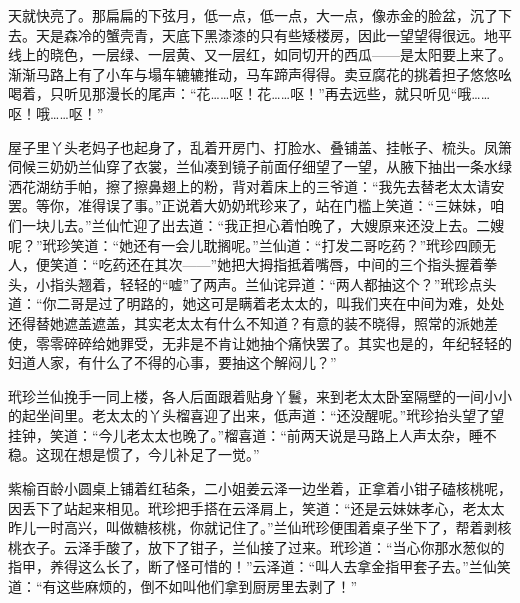\par 天就快亮了。那扁扁的下弦月，低一点，低一点，大一点，像赤金的脸盆，沉了下去。天是森冷的蟹壳青，天底下黑漆漆的只有些矮楼房，因此一望望得很远。地平线上的晓色，一层绿、一层黄、又一层红，如同切开的西瓜——是太阳要上来了。渐渐马路上有了小车与塌车辘辘推动，马车蹄声得得。卖豆腐花的挑着担子悠悠吆喝着，只听见那漫长的尾声：“花……呕！花……呕！”再去远些，就只听见“哦……呕！哦……呕！”
\par 屋子里丫头老妈子也起身了，乱着开房门、打脸水、叠铺盖、挂帐子、梳头。凤箫伺候三奶奶兰仙穿了衣裳，兰仙凑到镜子前面仔细望了一望，从腋下抽出一条水绿洒花湖纺手帕，擦了擦鼻翅上的粉，背对着床上的三爷道：“我先去替老太太请安罢。等你，准得误了事。”正说着大奶奶玳珍来了，站在门槛上笑道：“三妹妹，咱们一块儿去。”兰仙忙迎了出去道：“我正担心着怕晚了，大嫂原来还没上去。二嫂呢？”玳珍笑道：“她还有一会儿耽搁呢。”兰仙道：“打发二哥吃药？”玳珍四顾无人，便笑道：“吃药还在其次——”她把大拇指抵着嘴唇，中间的三个指头握着拳头，小指头翘着，轻轻的“嘘”了两声。兰仙诧异道：“两人都抽这个？”玳珍点头道：“你二哥是过了明路的，她这可是瞒着老太太的，叫我们夹在中间为难，处处还得替她遮盖遮盖，其实老太太有什么不知道？有意的装不晓得，照常的派她差使，零零碎碎给她罪受，无非是不肯让她抽个痛快罢了。其实也是的，年纪轻轻的妇道人家，有什么了不得的心事，要抽这个解闷儿？”
\par 玳珍兰仙挽手一同上楼，各人后面跟着贴身丫鬟，来到老太太卧室隔壁的一间小小的起坐间里。老太太的丫头榴喜迎了出来，低声道：“还没醒呢。”玳珍抬头望了望挂钟，笑道：“今儿老太太也晚了。”榴喜道：“前两天说是马路上人声太杂，睡不稳。这现在想是惯了，今儿补足了一觉。”
\par 紫榆百龄小圆桌上铺着红毡条，二小姐姜云泽一边坐着，正拿着小钳子磕核桃呢，因丢下了站起来相见。玳珍把手搭在云泽肩上，笑道：“还是云妹妹孝心，老太太昨儿一时高兴，叫做糖核桃，你就记住了。”兰仙玳珍便围着桌子坐下了，帮着剥核桃衣子。云泽手酸了，放下了钳子，兰仙接了过来。玳珍道：“当心你那水葱似的指甲，养得这么长了，断了怪可惜的！”云泽道：“叫人去拿金指甲套子去。”兰仙笑道：“有这些麻烦的，倒不如叫他们拿到厨房里去剥了！”
